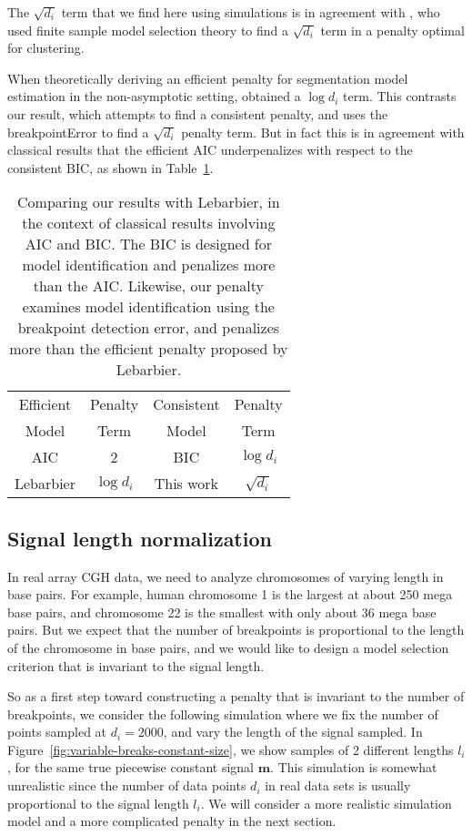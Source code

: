 \documentclass{article}
\begin{document}
The $\sqrt{d_i}$ term that we find here using simulations is in
agreement with \citet{aurelie}, who used finite sample model selection
theory to find a $\sqrt{d_i}$ term in a penalty optimal for
clustering.

When theoretically deriving an efficient penalty for segmentation
model estimation in the non-asymptotic setting, \citet{lebarbier}
obtained a $\log d_i$ term. This contrasts our result, which attempts
to find a consistent penalty, and uses the breakpointError to find a
$\sqrt{d_i}$ penalty term. But in fact this is in agreement with
classical results that the efficient AIC underpenalizes with respect
to the consistent BIC, as shown in Table~\ref{tab:AIC-BIC}.

\begin{table}[H]
  \centering
  \begin{tabular}{cc|cc}
     Efficient & Penalty & Consistent & Penalty \\
     Model & Term & Model & Term\\
     \hline
     AIC & 2 & BIC & $\log d_i$\\
     Lebarbier & $\log d_i$ & This work & $\sqrt{d_i}$\\
  \end{tabular}
  \caption{Comparing our results with Lebarbier, 
in the context of classical results involving AIC and BIC. 
The BIC is designed for model identification and penalizes more than the AIC.
Likewise, our penalty examines model identification using the breakpoint
detection error, and penalizes more than the efficient penalty proposed
by Lebarbier.}
  \label{tab:AIC-BIC}
\end{table}



\newpage
\subsection{Signal length normalization}
\label{variable_size}
In real array CGH data, we need to analyze chromosomes of varying length
in base pairs. For example, human chromosome 1 is the largest at about
250 mega base pairs, and chromosome 22 is the smallest with only about
36 mega base pairs. But we expect that the number of breakpoints is
proportional to the length of the chromosome in base pairs, and we would
like to design a model selection criterion that is invariant to the
signal length.

So as a first step toward constructing a penalty that is invariant to
the number of breakpoints, we consider the following simulation where
we fix the number of points sampled at $d_i=2000$, and vary the length
of the signal sampled. In
Figure~\ref{fig:variable-breaks-constant-size}, we show samples of 2
different lengths $l_i$, for the same true piecewise constant signal
$\mathbf m$. This simulation is somewhat unrealistic since the number
of data points $d_i$ in real data sets is usually proportional to the
signal length $l_i$. We will consider a more realistic simulation
model and a more complicated penalty in the next section.
\end{document}
